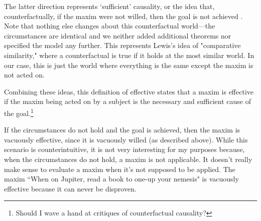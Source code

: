 \begin{isabellebody}
\begin{isamarkuptext}
The latter direction represents `sufficient' causality, or the idea that, counterfactually,
if the maxim were not willed, then the goal is not achieved \cite{lewiscausality}. Note that nothing else changes about this
counterfactual world—the circumstances are identical and we neither added additional theorems nor 
specified the model any further. This represents Lewis's idea of "comparative similarity," \cite{lewiscounterfactuals} where 
a counterfactual is true if it holds at the most similar world. In our case, this is just the world 
where everything is the same except the maxim is not acted on.

Combining these ideas, this definition of effective states that a maxim is effective if the 
maxim being acted on by a subject is the necessary and sufficient cause of the goal.\footnote{Should I wave a hand at critiques of counterfactual causality?}

If the circumstances do not hold and the goal is achieved, then the maxim is vacuously effective, since 
it is vacuously willed (as described above). While this scenario is counterintuitive, it is not very 
interesting for my purposes because, when the circumstances do not hold, a maxim is not applicable. It 
doesn't really make sense to evaluate a maxim when it's not supposed to be applied. The maxim ``When on Jupiter,
read a book to one-up your nemesis" is vacuously effective because it can never be disproven.%
\end{isamarkuptext}\isamarkuptrue%
%
\isadelimtheory
%
\endisadelimtheory
%
\isatagtheory
%
\endisatagtheory
{\isafoldtheory}%
%
\isadelimtheory
%
\endisadelimtheory
%
\end{isabellebody}%
\endinput
